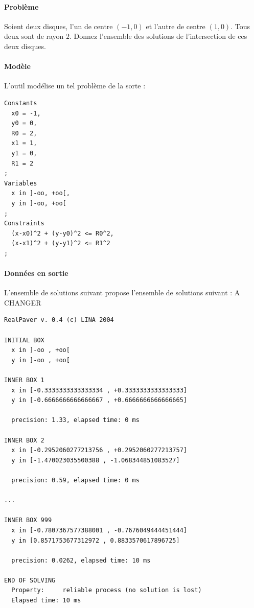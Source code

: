 \paragraph{Problème}
Soient deux disques, l'un de centre $(-1,0)$ et l'autre de centre $(1,0)$. Tous deux sont de rayon $2$. Donnez l'ensemble des solutions de l'intersection de ces deux disques.
\paragraph{Modèle}
L'outil \realpaver{}  modélise un tel problème de la sorte :
\label{realprob}
\begin{verbatim} 
Constants
  x0 = -1,
  y0 = 0,
  R0 = 2,
  x1 = 1,
  y1 = 0,
  R1 = 2
;
Variables
  x in ]-oo, +oo[,
  y in ]-oo, +oo[
;
Constraints
  (x-x0)^2 + (y-y0)^2 <= R0^2,
  (x-x1)^2 + (y-y1)^2 <= R1^2
;
\end{verbatim}
\paragraph{Données en sortie}
L'ensemble de solutions suivant \realpaver propose l'ensemble de solutions suivant : 
{\color{red} A CHANGER}
\begin{verbatim}
RealPaver v. 0.4 (c) LINA 2004

INITIAL BOX
  x in ]-oo , +oo[
  y in ]-oo , +oo[

INNER BOX 1
  x in [-0.3333333333333334 , +0.3333333333333333]
  y in [-0.6666666666666667 , +0.6666666666666665]

  precision: 1.33, elapsed time: 0 ms

INNER BOX 2
  x in [-0.2952060277213756 , +0.2952060277213757]
  y in [-1.470023035500388 , -1.068344851083527]

  precision: 0.59, elapsed time: 0 ms

...

INNER BOX 999
  x in [-0.7807367577388001 , -0.7676049444451444]
  y in [0.8571753677312972 , 0.8833570617896725]

  precision: 0.0262, elapsed time: 10 ms

END OF SOLVING
  Property:     reliable process (no solution is lost)
  Elapsed time: 10 ms


\end{verbatim}

